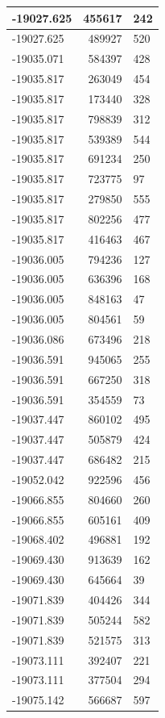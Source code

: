 \documentclass[]{book}
\theoremstyle{definition}
\theoremstyle{definition}
\theoremstyle{definition}
\theoremstyle{remark}
\begin{document}
\begin{tabular}{l|r|l}
\hline
-19027.625 & 455617 & 242\\
\hline
-19027.625 & 489927 & 520\\
\hline
-19035.071 & 584397 & 428\\
\hline
-19035.817 & 263049 & 454\\
\hline
-19035.817 & 173440 & 328\\
\hline
-19035.817 & 798839 & 312\\
\hline
-19035.817 & 539389 & 544\\
\hline
-19035.817 & 691234 & 250\\
\hline
-19035.817 & 723775 & 97\\
\hline
-19035.817 & 279850 & 555\\
\hline
-19035.817 & 802256 & 477\\
\hline
-19035.817 & 416463 & 467\\
\hline
-19036.005 & 794236 & 127\\
\hline
-19036.005 & 636396 & 168\\
\hline
-19036.005 & 848163 & 47\\
\hline
-19036.005 & 804561 & 59\\
\hline
-19036.086 & 673496 & 218\\
\hline
-19036.591 & 945065 & 255\\
\hline
-19036.591 & 667250 & 318\\
\hline
-19036.591 & 354559 & 73\\
\hline
-19037.447 & 860102 & 495\\
\hline
-19037.447 & 505879 & 424\\
\hline
-19037.447 & 686482 & 215\\
\hline
-19052.042 & 922596 & 456\\
\hline
-19066.855 & 804660 & 260\\
\hline
-19066.855 & 605161 & 409\\
\hline
-19068.402 & 496881 & 192\\
\hline
-19069.430 & 913639 & 162\\
\hline
-19069.430 & 645664 & 39\\
\hline
-19071.839 & 404426 & 344\\
\hline
-19071.839 & 505244 & 582\\
\hline
-19071.839 & 521575 & 313\\
\hline
-19073.111 & 392407 & 221\\
\hline
-19073.111 & 377504 & 294\\
\hline
-19075.142 & 566687 & 597\\

\end{tabular}
\end{document}
